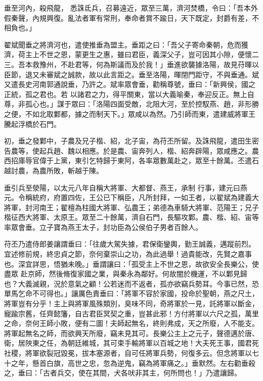 \begin{pinyinscope}
 垂至河內，殺飛龍，
 悉誅氐兵，召募遠近，眾至三萬，濟河焚橋，令曰：「吾本外假秦聲，內規興復。亂法者軍有常刑，奉命者賞不踰日，天下既定，封爵有差，不相負也。」



 翟斌聞垂之將濟河也，遣使推垂為盟主。垂距之曰：「吾父子寄命秦朝，危而獲濟，荷主上不世之恩，蒙更生之惠，雖曰君臣，義深父子，豈可因其小隙，便懷二三。吾本救豫州，不赴君等，何為斯議而及於我！」垂進欲襲據洛陽，故見苻暉以臣節，退又未審斌之誠款，故以此言距之。垂至洛陽，暉閉門距守，不與垂通。斌又遣長史河南郭通說垂，乃許之。斌率眾會垂，勸稱尊號，垂曰：「新興侯，國之正統，孤之君也。若
 以諸君之力，得平關東，當以大義喻秦，奉迎反正。無上自尊，非孤心也。」謀于眾曰：「洛陽四面受敵，北阻大河，至於控馭燕、趙，非形勝之便，不如北取鄴都，據之而制天下。」眾咸以為然。乃引師而東，遣建威將軍王騰起浮橋於石門。



 初，垂之發鄴中，子農及兄子楷、紹，北子宙，為苻丕所留。及誅飛龍，遣田生密告農等，使起兵趙、魏以相應。於是農、宙奔列人，楷、紹奔辟陽，眾咸應之。農西招庫辱官偉于上黨，東引乞特歸于東阿，各率眾數萬赴之，眾至十餘萬。丕遣石越討農，為農所敗，斬越于陳。



 垂引兵至滎陽，以太元八年自稱大將軍、大都督、燕王，承制
 行事，建元曰燕元。令稱統府，府置四佐，王公已下稱臣，凡所封拜，一如王者，以翟斌為建義大將軍，封河南王；翟檀為柱國大將軍、弘農王；弟德為車騎大將軍、范陽王；兄子楷征西大將軍、太原王。眾至二十餘萬，濟自石門，長驅攻鄴。農、楷、紹、宙等率眾會垂。立子寶為燕王太子，封功臣為公侯伯子男者百餘人。



 苻丕乃遣侍郎姜讓謂垂曰：「往歲大駕失據，君保衛鑾輿，勤王誠義，邁蹤前烈。宜述修前規，終忠貞之節，奈何棄崇山之功，為此過舉！過貴能改，先賢之嘉事也。深宜詳思，悟猶未晚。」垂謂讓曰：「孤受主上不世之恩，故欲安全長樂公，使盡眾
 赴京師，然後脩復家國之業，與秦永為鄰好。何故闇於機運，不以鄴見歸也？大義滅親，況於意氣之顧！公若迷而不返者，孤亦欲竊兵勢耳。今事已然，恐單馬乞命不可得也。」讓厲色責垂曰：「將軍不容於家國，投命於聖朝，燕之尺土，將軍豈有分乎！主上與將軍風殊類別，臭味不同，奇將軍於一見，託將軍以斷金，寵踰宗舊，任齊懿籓，自古君臣冥契之重，豈甚此邪！方付將軍以六尺之孤，萬里之命，奈何王師小敗，便有二圖！夫師起無名，終則弗成，天之所廢，人不能支。將軍起無名之師，而欲興天所廢，竊未見其可。長樂公主上之元子，聲德邁於唐、
 衛，居陜東之任，為朝廷維城，其可束手輸將軍以百城之地！大夫死王事，國君死社稷，將軍欲裂冠毀冕，拔本塞源者，自可任將軍兵勢，何復多云。但念將軍以七十之年，懸首白旗，高世之忠，忽為逆鬼，竊為將軍痛之。」垂默然。左右勸垂殺之，垂曰：「古者兵交，使在其間，犬各吠非其主，何所問也！」乃遣讓歸。




\end{pinyinscope}
